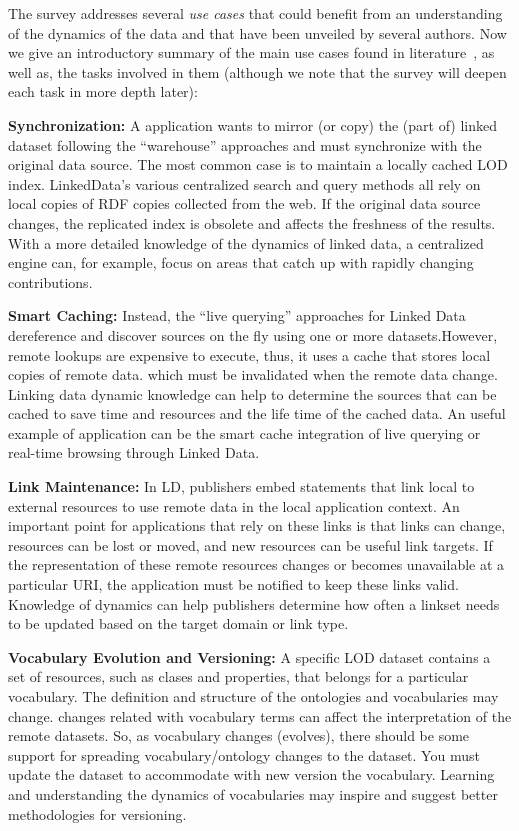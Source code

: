 \documentclass[sw]{iosart2x}
\begin{document}
The survey addresses several \textit{use cases} that could benefit from an understanding of the dynamics of the data and that have been unveiled by several authors. Now we give an introductory summary of the main use cases found in literature~\cite{UmbrichVH10, PopitschH11, KaferUHP12, KaferAUOH13, MeimarisPPGS14}, as well as, the tasks involved in them (although we note that the survey will deepen each task in more depth later):

\textbf{Synchronization:} 
A application wants to mirror (or copy) the (part of) linked dataset following the ``warehouse'' approaches and must synchronize with the original data source.
The most common case is to maintain a locally cached LOD index. LinkedData's various centralized search and query methods all rely on local copies of RDF copies collected from the web. If the original data source changes, the replicated index is obsolete and affects the freshness of the results. With a more detailed knowledge of the dynamics of linked data, a centralized engine can, for example, focus on areas that catch up with rapidly changing contributions.

\textbf{Smart Caching:}
Instead, the ``live querying'' approaches for Linked Data dereference and discover sources on the fly using one or more datasets.However, remote lookups are expensive to execute, thus, it uses a cache that stores local copies of remote data. which must be invalidated when the remote data change. Linking data dynamic knowledge can help to determine the sources that can be cached to save time and resources and the life time of the cached data. An useful example of application can be the smart cache integration of live querying or real-time browsing through Linked Data.

\textbf{Link Maintenance:}
In LD, publishers embed statements that link local to external resources to use remote data in the local application context. An important point for applications that rely on these links is that links can change, resources can be lost or moved, and new resources can be useful link targets. If the representation of these remote resources changes or becomes unavailable at a particular URI, the application must be notified to keep these links valid. Knowledge of dynamics can help publishers determine how often a linkset needs to be updated based on the target domain or link type.

\textbf{Vocabulary Evolution and Versioning:}
A specific LOD dataset contains a set of resources, such as clases and properties, that belongs for a particular vocabulary. The definition and structure of the ontologies and vocabularies may change.  changes related with vocabulary terms can affect the interpretation of the remote datasets. So, as vocabulary changes (evolves), there should be some support for spreading vocabulary/ontology changes to the dataset. You must update the dataset to accommodate with new version the vocabulary.
Learning and understanding the dynamics of vocabularies may inspire and suggest better methodologies for versioning.
\end{document}
